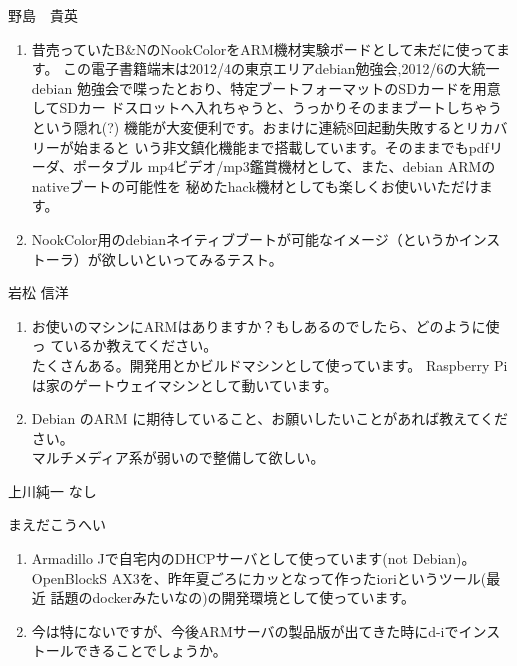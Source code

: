 \begin{prework}{ 野島　貴英 }
\begin{enumerate}
\item  昔売っていたB\&NのNookColorをARM機材実験ボードとして未だに使ってます。
この電子書籍端末は2012/4の東京エリアdebian勉強会,2012/6の大統一debian
勉強会で喋ったとおり、特定ブートフォーマットのSDカードを用意してSDカー
ドスロットへ入れちゃうと、うっかりそのままブートしちゃうという隠れ(?)
機能が大変便利です。おまけに連続8回起動失敗するとリカバリーが始まると
いう非文鎮化機能まで搭載しています。そのままでもpdfリーダ、ポータブル
mp4ビデオ/mp3鑑賞機材として、また、debian ARMのnativeブートの可能性を
秘めたhack機材としても楽しくお使いいただけます。
\item  NookColor用のdebianネイティブブートが可能なイメージ（というかインス
  トーラ）が欲しいといってみるテスト。
\end{enumerate}
\end{prework}

\begin{prework}{ 岩松 信洋 }
\begin{enumerate}
\item  お使いのマシンにARMはありますか？もしあるのでしたら、どのように使っ
ているか教えてください。\\
たくさんある。開発用とかビルドマシンとして使っています。
Raspberry Pi は家のゲートウェイマシンとして動いています。
\item  Debian のARM に期待していること、お願いしたいことがあれば教えてくだ
さい。\\
マルチメディア系が弱いので整備して欲しい。
\end{enumerate}

\end{prework}

\begin{prework}{ 上川純一 }
なし
\end{prework}

\begin{prework}{ まえだこうへい }
\begin{enumerate}
\item  Armadillo Jで自宅内のDHCPサーバとして使っています(not Debian)。
OpenBlockS AX3を、昨年夏ごろにカッとなって作ったioriというツール(最近
話題のdockerみたいなの)の開発環境として使っています。
\item  今は特にないですが、今後ARMサーバの製品版が出てきた時にd-iでインス
トールできることでしょうか。
\end{enumerate}
\end{prework}
